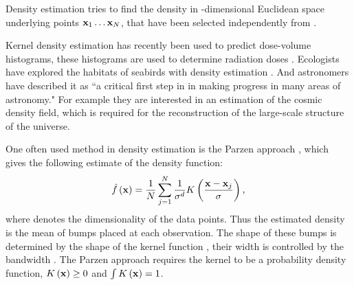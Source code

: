 Density estimation tries to find the density \varDensityFunction{\varPattern} in \varDim-dimensional Euclidean space underlying \varNumPatterns points $\varPattern[1] \dotsc \varPattern[\varNumPatterns]$, that have been selected independently from \varDensityFunction{\varPattern}. 

Kernel density estimation has recently been used to predict dose-volume histograms, these histograms are used to determine radiation doses \cite{SkarpmanDose2015}. Ecologists have explored the habitats of seabirds with density estimation \cite{lees2016using}. And astronomers have described it as ``a critical first step in in making progress in many areas of astronomy." \cite{ferdosi2011comparison} For example they are interested in an estimation of the cosmic density field, which is required for the reconstruction of the large-scale structure of the universe.

One often used method in density estimation is the Parzen approach \cite{parzen1962estimation}, which gives the following estimate of the density function:
\begin{equation}\label{eq:1:parzen}
	\varEstimatedDensityFunction{\varPattern} = \frac{1}{\varNumPatterns}\sum_{j = 1}^{\varNumPatterns} \frac{1}{\varBandwidth^\varDim}\varKernel{\frac{\varPattern - \varPattern[j]}{\varBandwidth}},
\end{equation}
where \varDim denotes the dimensionality of the data points.
%
Thus the estimated density is the mean of bumps placed at each observation. The shape of these bumps is determined by the shape of the kernel function \varKernel{\cdot}, their width is controlled by the bandwidth \varBandwidth \cite{silverman1986density}. The Parzen approach requires the kernel to be a probability density function, \ie $\varKernel{\varPattern} \geq 0$ and $\int \varKernel{\varPattern} = 1$.

